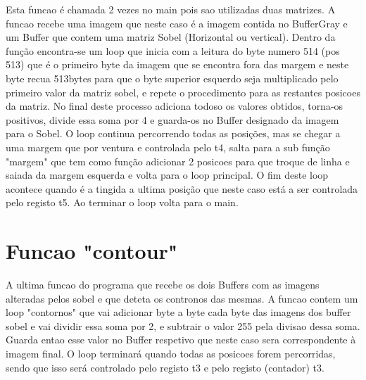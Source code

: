 \documentclass[11pt]{article}
\begin{document}
Esta funcao é chamada 2 vezes no main pois sao utilizadas duas matrizes.
A funcao recebe uma imagem que neste caso é a imagem contida no BufferGray e um Buffer que contem uma matriz Sobel (Horizontal ou vertical). 
Dentro da função encontra-se um loop que inicia com a leitura do byte numero 514 (pos 513) que é o primeiro byte da imagem que se encontra fora das margem e neste byte recua 513bytes para que o byte superior esquerdo seja multiplicado pelo primeiro valor da matriz sobel, e repete o procedimento para as restantes posicoes da matriz. No final deste processo adiciona todoso os valores obtidos, torna-os positivos, divide essa soma por 4 e guarda-os no Buffer designado da imagem para o Sobel. O loop continua percorrendo todas as posições, mas se chegar a uma margem que por ventura e controlada pelo t4, salta para a sub função "margem" que tem como função adicionar 2 posicoes para que troque de linha e saiada da margem esquerda e volta para o loop principal. O fim deste loop acontece quando é a tingida a ultima posição que neste caso está a ser controlada pelo registo t5. Ao terminar o loop volta para o main.

\section{Funcao "contour"}

A ultima funcao do programa que recebe os dois Buffers com as imagens alteradas pelos sobel e que deteta os contronos das mesmas.
A funcao contem um loop "contornos" que vai adicionar byte a byte cada byte das imagens dos buffer sobel e vai dividir essa soma por 2, e subtrair o valor 255 pela divisao dessa soma. Guarda entao esse valor no Buffer respetivo que neste caso sera correspondente à imagem final. O loop terminará quando todas as posicoes forem percorridas, sendo que isso será controlado pelo registo t3 e pelo registo (contador) t3.
\end{document}
